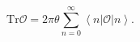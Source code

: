 \begin{equation}
\text{$\mathrm{Tr}$}\mathcal{O}=2\pi\theta\sum_{n=0}^{\infty}\left\langle
n\right\vert \mathcal{O}\left\vert n\right\rangle .
\end{equation}

